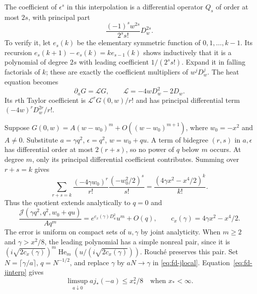 The coefficient of $\epsilon^s$ in this interpolation is a differential
operator $Q_s$ of order at most $2s$, with principal part
\[
 \frac{(-1)^s w^{2s}}{2^s s!}D_w^{2s}.
\]
To verify it, let $e_s(k)$ be the elementary symmetric function of
$0,1,\ldots,k-1$.  Its recursion
$e_s(k+1)-e_s(k)=k e_{s-1}(k)$ shows inductively that it is a
polynomial of degree $2s$ with leading coefficient $1/(2^s s!)$.
Expand it in falling factorials of $k$; these are exactly the
coefficient multipliers of $w^jD_w^j$.
The heat equation becomes
\begin{equation}\label{eq:fd-wheat}
 \partial_aG=\mathcal L G,\qquad
 \mathcal L=-4wD_w^2-2D_w.
\end{equation}
Its $r$th Taylor coefficient is $\mathcal L^rG(0,w)/r!$ and has
principal differential term $(-4w)^rD_w^{2r}/r!$.

Suppose $G(0,w)=A(w-w_0)^m+O((w-w_0)^{m+1})$,
where $w_0=-x^2$ and $A\ne0$.
Substitute $a=\gamma q^2$, $\epsilon=q^2$, $w=w_0+qu$.
A term of bidegree $(r,s)$ in $a,\epsilon$ has differential order
at most $2(r+s)$, so no power of $q$ below $m$ occurs.
At degree $m$, only its principal differential coefficient contributes.
Summing over $r+s=k$ gives
\[
 \sum_{r+s=k}\frac{(-4\gamma w_0)^r}{r!}
                 \frac{(-w_0^2/2)^s}{s!}
       =\frac{(4\gamma x^2-x^4/2)^k}{k!}.
\]
Thus the quotient extends analytically to $q=0$ and
\begin{equation}\label{eq:fd-jlocal}
 \frac{\mathcal J(\gamma q^2,q^2,w_0+qu)}{Aq^m}
   =e^{c_x(\gamma)D_u^2}u^m+O(q),\qquad
 c_x(\gamma)=4\gamma x^2-x^4/2.
\end{equation}
The error is uniform on compact sets of $u,\gamma$ by joint analyticity.
When $m\ge2$ and $\gamma>x^2/8$, the leading polynomial has a
simple nonreal pair, since it is
$(i\sqrt{2c_x(\gamma)})^m
\operatorname{He}_m(u/(i\sqrt{2c_x(\gamma)}))$.
Rouch\'e preserves this pair.  Set $N=\lceil\gamma/a\rceil$,
$q=N^{-1/2}$, and replace $\gamma$ by $aN\to\gamma$ in
\eqref{eq:fd-jlocal}.  Equation~\eqref{eq:fd-jinterp} gives
\begin{equation}\label{eq:fd-jupper}
 \limsup_{a\downarrow0}a j_*(-a)\le x_*^2/8
 \quad\text{when }x_*<\infty.
\end{equation}

